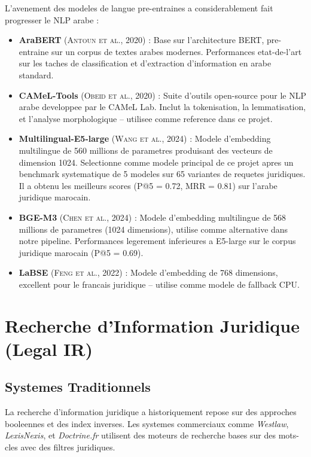 L'avenement des modeles de langue pre-entraines a considerablement fait progresser le NLP arabe :

\begin{itemize}
    \item \textbf{AraBERT} (\textsc{Antoun et al.}, 2020) : Base sur l'architecture BERT, pre-entraine sur un corpus de textes arabes modernes. Performances etat-de-l'art sur les taches de classification et d'extraction d'information en arabe standard.
    
    \item \textbf{CAMeL-Tools} (\textsc{Obeid et al.}, 2020) : Suite d'outils open-source pour le NLP arabe developpee par le CAMeL Lab. Inclut la tokenisation, la lemmatisation, et l'analyse morphologique -- utilisee comme reference dans ce projet.
    
    \item \textbf{Multilingual-E5-large} (\textsc{Wang et al.}, 2024) : Modele d'embedding multilingue de 560 millions de parametres produisant des vecteurs de dimension 1024. Selectionne comme modele principal de ce projet apres un benchmark systematique de 5 modeles sur 65 variantes de requetes juridiques. Il a obtenu les meilleurs scores (P@5 = 0.72, MRR = 0.81) sur l'arabe juridique marocain.
    
    \item \textbf{BGE-M3} (\textsc{Chen et al.}, 2024) : Modele d'embedding multilingue de 568 millions de parametres (1024 dimensions), utilise comme alternative dans notre pipeline. Performances legerement inferieures a E5-large sur le corpus juridique marocain (P@5 = 0.69).
    
    \item \textbf{LaBSE} (\textsc{Feng et al.}, 2022) : Modele d'embedding de 768 dimensions, excellent pour le francais juridique -- utilise comme modele de fallback CPU.
\end{itemize}

\section{Recherche d'Information Juridique (Legal IR)}

\subsection{Systemes Traditionnels}

La recherche d'information juridique a historiquement repose sur des approches booleennes et des index inverses. Les systemes commerciaux comme \textit{Westlaw}, \textit{LexisNexis}, et \textit{Doctrine.fr} utilisent des moteurs de recherche bases sur des mots-cles avec des filtres juridiques.

